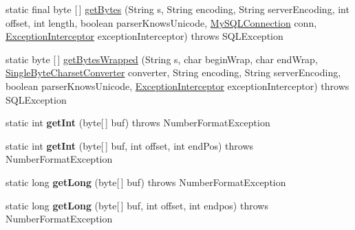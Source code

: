 \begin{DoxyCompactItemize}
\item 
static final byte \mbox{[}$\,$\mbox{]} \mbox{\hyperlink{classcom_1_1mysql_1_1jdbc_1_1_string_utils_a0782bc62fd8f75d707d84487c9cd50cc}{get\+Bytes}} (String s, String encoding, String server\+Encoding, int offset, int length, boolean parser\+Knows\+Unicode, \mbox{\hyperlink{interfacecom_1_1mysql_1_1jdbc_1_1_my_s_q_l_connection}{My\+S\+Q\+L\+Connection}} conn, \mbox{\hyperlink{interfacecom_1_1mysql_1_1jdbc_1_1_exception_interceptor}{Exception\+Interceptor}} exception\+Interceptor)  throws S\+Q\+L\+Exception 
\item 
static byte \mbox{[}$\,$\mbox{]} \mbox{\hyperlink{classcom_1_1mysql_1_1jdbc_1_1_string_utils_afd812ec650baa8ee5d9218e48ec7e026}{get\+Bytes\+Wrapped}} (String s, char begin\+Wrap, char end\+Wrap, \mbox{\hyperlink{classcom_1_1mysql_1_1jdbc_1_1_single_byte_charset_converter}{Single\+Byte\+Charset\+Converter}} converter, String encoding, String server\+Encoding, boolean parser\+Knows\+Unicode, \mbox{\hyperlink{interfacecom_1_1mysql_1_1jdbc_1_1_exception_interceptor}{Exception\+Interceptor}} exception\+Interceptor)  throws S\+Q\+L\+Exception 
\item 
\mbox{\label{classcom_1_1mysql_1_1jdbc_1_1_string_utils_ad129a2058164beeee111efd6b04ff9d4}} 
static int {\bfseries get\+Int} (byte\mbox{[}$\,$\mbox{]} buf)  throws Number\+Format\+Exception 
\item 
\mbox{\label{classcom_1_1mysql_1_1jdbc_1_1_string_utils_a0c5338d779649ba9355d344e6052e4b3}} 
static int {\bfseries get\+Int} (byte\mbox{[}$\,$\mbox{]} buf, int offset, int end\+Pos)  throws Number\+Format\+Exception 
\item 
\mbox{\label{classcom_1_1mysql_1_1jdbc_1_1_string_utils_a7a7d4c7334cf2fcdfb22e2edebe376e7}} 
static long {\bfseries get\+Long} (byte\mbox{[}$\,$\mbox{]} buf)  throws Number\+Format\+Exception 
\item 
\mbox{\label{classcom_1_1mysql_1_1jdbc_1_1_string_utils_a2677663c1b71f1d37a0277acd2f57ecb}} 
static long {\bfseries get\+Long} (byte\mbox{[}$\,$\mbox{]} buf, int offset, int endpos)  throws Number\+Format\+Exception 
\item 
\mbox{\label{classcom_1_1mysql_1_1jdbc_1_1_string_utils_ad64d862e69d854b60eaadca3c4d976b8}} 

\end{DoxyCompactItemize}
